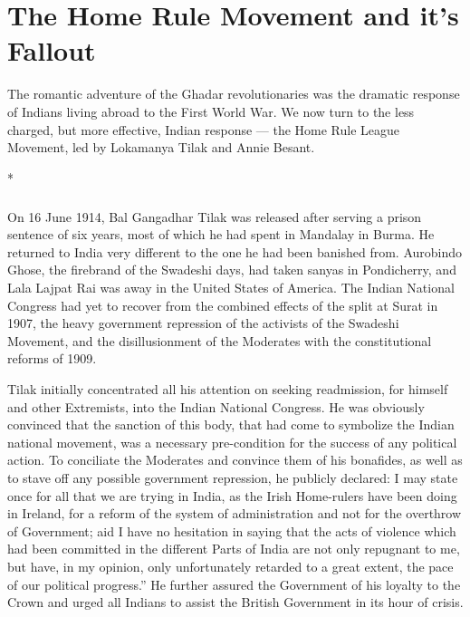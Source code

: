 \cleardoublepage
\chapter{The Home Rule Movement and it's Fallout}

The romantic adventure of the Ghadar revolutionaries was the dramatic response of Indians living abroad to the First World War. We now turn to the less charged, but more effective, Indian response — the Home Rule League Movement, led by Lokamanya Tilak and Annie Besant.

\begin{center}*\end{center}

\paragraph*{}


On 16 June 1914, Bal Gangadhar Tilak was released after serving a prison sentence of six years, most of which he had spent in Mandalay in Burma. He returned to India very different to the one he had been banished from. Aurobindo Ghose, the firebrand of the Swadeshi days, had taken sanyas in Pondicherry, and Lala Lajpat Rai was away in the United States of America. The Indian National Congress had yet to recover from the combined effects of the split at Surat in 1907, the heavy government repression of the activists of the Swadeshi Movement, and the disillusionment of the Moderates with the constitutional reforms of 1909.

Tilak initially concentrated all his attention on seeking readmission, for himself and other Extremists, into the Indian National Congress. He was obviously convinced that the sanction of this body, that had come to symbolize the Indian national movement, was a necessary pre-condition for the success of any political action. To conciliate the Moderates and convince them of his bonafides, as well as to stave off any possible government repression, he publicly declared: I may state once for all that we are trying in India, as the Irish Home-rulers have been doing in Ireland, for a reform of the system of administration and not for the overthrow of Government; aid I have no hesitation in saying that the acts of violence which had been committed in the different Parts of India are not only repugnant to me, but have, in my opinion, only unfortunately retarded to a great extent, the pace of our political progress.'' He further assured the Government of his loyalty to the Crown and urged all Indians to assist the British Government in its hour of crisis.

